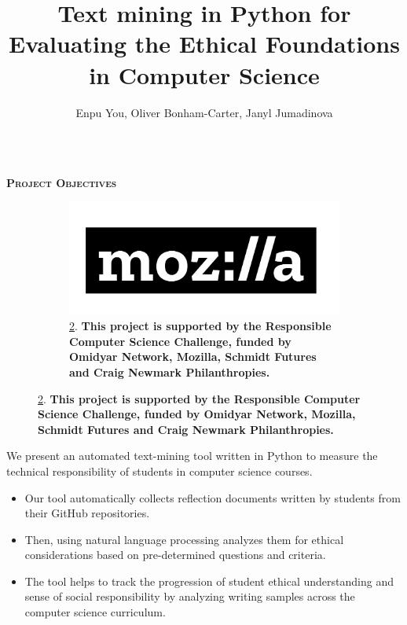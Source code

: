 \documentclass[final,t]{beamer}
\title[]{Text mining in Python for Evaluating the Ethical Foundations in Computer Science}
\author[Bonham-Carter]{Enpu You, Oliver Bonham-Carter, Janyl Jumadinova}
\institute{Dept of Computer Science, Allegheny College \\ Meadville, PA}
\begin{document}
    \begin{frame}{}
        \vspace*{9mm} %
        \begin{columns}[t]
        	\begin{column}{1\linewidth}
%
%

%
%
                \begin{block}{\textsc{\textbf{Project Objectives}}}
				\vspace*{2.0mm}

		\begin{figure}
					\begin{figure}
						\centering
						\includegraphics[scale = .25]{graphics/MozillaLogo_BW.jpg}
                        \caption{\ref{fig:MozillaLogo_BW}. \small \textbf{This project is supported by the Responsible Computer Science Challenge, funded by Omidyar Network, Mozilla, Schmidt Futures and Craig Newmark Philanthropies.}}
                        \label{fig:MozillaLogo_BW}
					\end{figure}
                        \end{figure} 

                        We present an automated text-mining tool written in Python to measure the technical responsibility of students in computer science courses.

				\begin{itemize}
					\item Our tool automatically collects reflection documents written by students from their GitHub repositories.
					\item Then, using natural language processing analyzes them for ethical considerations based on pre-determined questions and criteria. 
					\item The tool helps to track the progression of student ethical understanding and sense of social responsibility by analyzing writing samples across the computer science curriculum.


\end{itemize}
\end{block}
\end{column}
\end{columns}
\end{frame}
\end{document}
